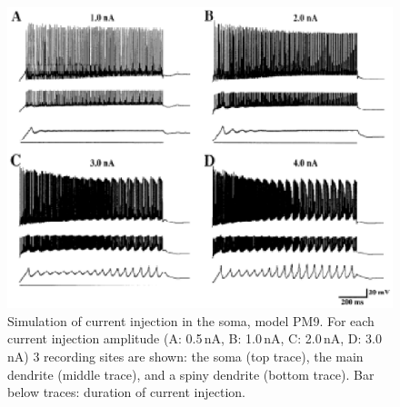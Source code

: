 \documentclass[12pt]{article}
\begin{document}
\clearpage

\begin{figure}[h]
\centering
   \includegraphics[scale=0.75]{figures/Fig.1.4.eps}
   \caption{Simulation of current injection in the
soma, model PM9. For each current injection amplitude
(A: 0.5\,nA, B: 1.0\,nA, C: 2.0\,nA, D: 3.0\,
nA) 3 recording sites are shown: the soma (top
trace), the main dendrite (middle trace), and a
spiny dendrite (bottom trace). Bar below traces: duration
of current injection.}
   \label{fig:DS1.4}
\end{figure}

\clearpage
\end{document}
